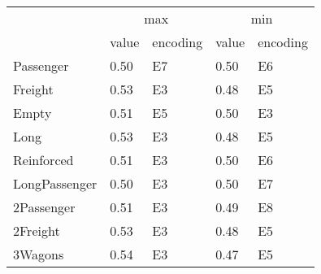 \begin{tabular}{lllll}
\toprule
 & \multicolumn{2}{c}{max} & \multicolumn{2}{c}{min} \\
 & value & encoding & value & encoding \\
\midrule
Passenger & 0.50 & E7 & 0.50 & E6 \\
Freight & 0.53 & E3 & 0.48 & E5 \\
Empty & 0.51 & E5 & 0.50 & E3 \\
Long & 0.53 & E3 & 0.48 & E5 \\
Reinforced & 0.51 & E3 & 0.50 & E6 \\
LongPassenger & 0.50 & E3 & 0.50 & E7 \\
2Passenger & 0.51 & E3 & 0.49 & E8 \\
2Freight & 0.53 & E3 & 0.48 & E5 \\
3Wagons & 0.54 & E3 & 0.47 & E5 \\
\bottomrule
\end{tabular}
